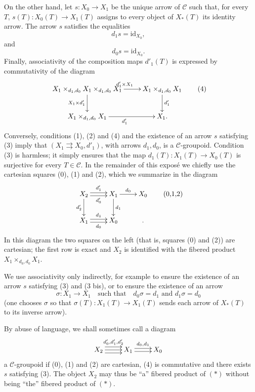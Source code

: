 On the other hand, let $s:X_0\to X_1$ be the unique arrow of $\mathcal C$ such that, for every $T$, $s(T):X_0(T)\to X_1(T)$ assigns to every object of $X_*(T)$ its identity arrow. The arrow $s$ satisfies the equalities
\[
d_1s=\mathrm{id}_{X_0},\tag{3}
\]
and
\[
d_0s=\mathrm{id}_{X_0}.\tag{3 bis}
\]
Finally, associativity of the composition maps $d'_1(T)$ is expressed by commutativity of the diagram
\[
\xymatrix{X_1\times_{d_1,d_0}X_1\times_{d_1,d_0}X_1\ar[r]^{d'_1\times X_1}\ar[d]_{X_1\times d'_1}&X_1\times_{d_1,d_0}X_1\ar[d]^{d'_1}\\X_1\times_{d_1,d_0}X_1\ar[r]_{d'_1}&X_1.}\tag{4}
\]
Conversely, conditions (1), (2) and (4) and the existence of an arrow $s$ satisfying (3) imply that $(X_1\rightrightarrows X_0,d'_1)$, with arrows $d_1,d_0$, is a $\mathcal C$-groupoid. Condition (3) is harmless; it simply ensures that the map $d_1(T):X_1(T)\to X_0(T)$ is surjective for every $T\in\mathcal C$. In the remainder of this exposé we chiefly use the cartesian squares (0), (1) and (2), which we summarize in the diagram
\[
\xymatrix{X_2\ar@<.5ex>[r]^{d'_1}\ar@<-.5ex>[r]_{d'_0}\ar[d]_{d'_2}&X_1\ar[r]^{d_0}\ar[d]^{d_1}&X_0\\X_1\ar@<.5ex>[r]^{d_1}\ar@<-.5ex>[r]_{d_0}&X_0&.}\tag{0,1,2}
\]
In this diagram the two squares on the left (that is, squares (0) and (2)) are cartesian; the first row is exact and $X_2$ is identified with the fibered product $X_1\times_{d_0,d_0}X_1$.

We use associativity only indirectly, for example to ensure the existence of an arrow $s$ satisfying (3) and (3 bis), or to ensure the existence of an arrow
\[
\sigma:X_1\to X_1\quad\text{such that}\quad d_0\sigma=d_1\text{ and }d_1\sigma=d_0\tag{$\dagger$}
\]
(one chooses $\sigma$ so that $\sigma(T):X_1(T)\to X_1(T)$ sends each arrow of $X_*(T)$ to its inverse arrow).

By abuse of language, we shall sometimes call a diagram
\[
\xymatrix{X_2\ar@<1ex>[r]^{d'_0,d'_1,d'_2}\ar[r]\ar@<-1ex>[r]&X_1\ar@<.5ex>[r]^{d_0,d_1}\ar@<-.5ex>[r]&X_0}
\]
a $\mathcal C$-groupoid if (0), (1) and (2) are cartesian, (4) is commutative and there exists $s$ satisfying (3). The object $X_2$ may thus be ``a'' fibered product of $(*)$ without being ``the'' fibered product of $(*)$.

